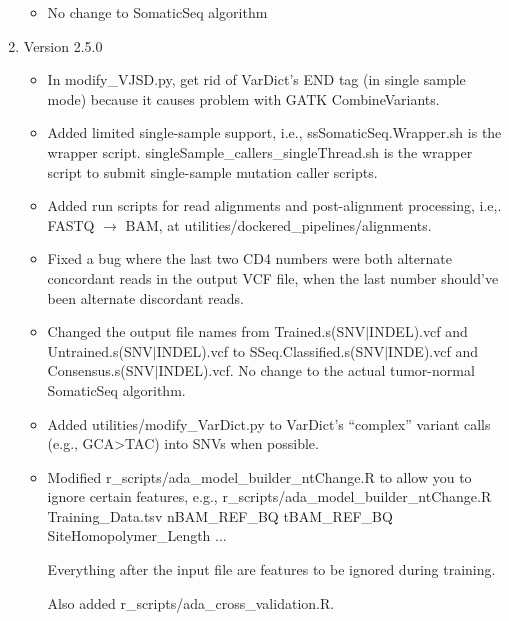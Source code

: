 \documentclass[10pt,letterpaper]{article}
\begin{document}
\begin{sloppypar}
\begin{enumerate}
\begin{itemize}
		  \item
		  No change to SomaticSeq algorithm
		
		\end{itemize}
	
	
	
	\item Version 2.5.0
	
		\begin{itemize}
		
		  \item
		  In modify\_VJSD.py, get rid of VarDict's END tag (in single sample mode) because it causes problem with GATK CombineVariants. 
		  
		  \item
		  Added limited single-sample support, i.e., ssSomaticSeq.Wrapper.sh is the wrapper script. singleSample\_callers\_singleThread.sh is the wrapper script to submit single-sample mutation caller scripts.
		  
		  \item
		  Added run scripts for read alignments and post-alignment processing, i.e,. FASTQ $\rightarrow$ BAM, at utilities/dockered\_pipelines/alignments.
		  
		  \item
		  Fixed a bug where the last two CD4 numbers were both alternate concordant reads in the output VCF file, when the last number should've been alternate discordant reads.
		  
		  \item
		  Changed the output file names from Trained.s(SNV$\vert$INDEL).vcf and Untrained.s(SNV$\vert$INDEL).vcf to SSeq.Classified.s(SNV$\vert$INDE).vcf and Consensus.s(SNV$\vert$INDEL).vcf. No change to the actual tumor-normal SomaticSeq algorithm.
		  
		  \item
		  Added utilities/modify\_VarDict.py to VarDict's ``complex'' variant calls (e.g., GCA>TAC) into SNVs when possible. 
		  
		  \item
		  Modified r\_scripts/ada\_model\_builder\_ntChange.R to allow you to ignore certain features, e.g., r\_scripts/ada\_model\_builder\_ntChange.R Training\_Data.tsv nBAM\_REF\_BQ tBAM\_REF\_BQ SiteHomopolymer\_Length ...
		  
		  Everything after the input file are features to be ignored during training.
		  
		  Also added r\_scripts/ada\_cross\_validation.R.
		

\end{itemize}
\end{enumerate}
\end{sloppypar}
\end{document}
